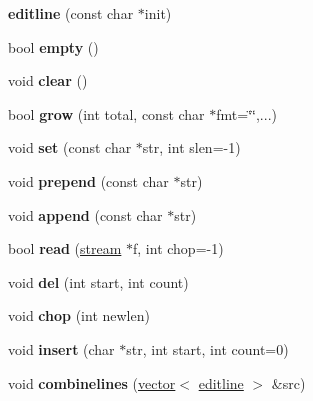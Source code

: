 \begin{DoxyCompactItemize}
\item 
\mbox{\label{structeditline_aaa101a9248d101995d593667581e4996}} 
{\bfseries editline} (const char $\ast$init)
\item 
\mbox{\label{structeditline_aff8a51dd9a54c65b674bc86bfa1566a9}} 
bool {\bfseries empty} ()
\item 
\mbox{\label{structeditline_a22d5497ef592e0df789e50288e9cddc9}} 
void {\bfseries clear} ()
\item 
\mbox{\label{structeditline_ad265849bc6b8e6d587b16be5fc7b47bb}} 
bool {\bfseries grow} (int total, const char $\ast$fmt=\char`\"{}\char`\"{},...)
\item 
\mbox{\label{structeditline_a68cad302d8daf88381753bbaeb3a6681}} 
void {\bfseries set} (const char $\ast$str, int slen=-\/1)
\item 
\mbox{\label{structeditline_a52837ff76228fbd8935117096475cd93}} 
void {\bfseries prepend} (const char $\ast$str)
\item 
\mbox{\label{structeditline_a389153edfce8843acac521157380300c}} 
void {\bfseries append} (const char $\ast$str)
\item 
\mbox{\label{structeditline_a80640b49f44eb8a0492135716c0df5f7}} 
bool {\bfseries read} (\hyperlink{structstream}{stream} $\ast$f, int chop=-\/1)
\item 
\mbox{\label{structeditline_aac1676e4f0579285cd16f585a465dec0}} 
void {\bfseries del} (int start, int count)
\item 
\mbox{\label{structeditline_a5ab95cb33794ff819377b04a54722ff3}} 
void {\bfseries chop} (int newlen)
\item 
\mbox{\label{structeditline_a01fb8b60099754c85e2c2941e6c1da53}} 
void {\bfseries insert} (char $\ast$str, int start, int count=0)
\item 
\mbox{\label{structeditline_a0e1a2086b6f1ff1f571878b8df38e9ea}} 
void {\bfseries combinelines} (\hyperlink{structvector}{vector}$<$ \hyperlink{structeditline}{editline} $>$ \&src)
\end{DoxyCompactItemize}
